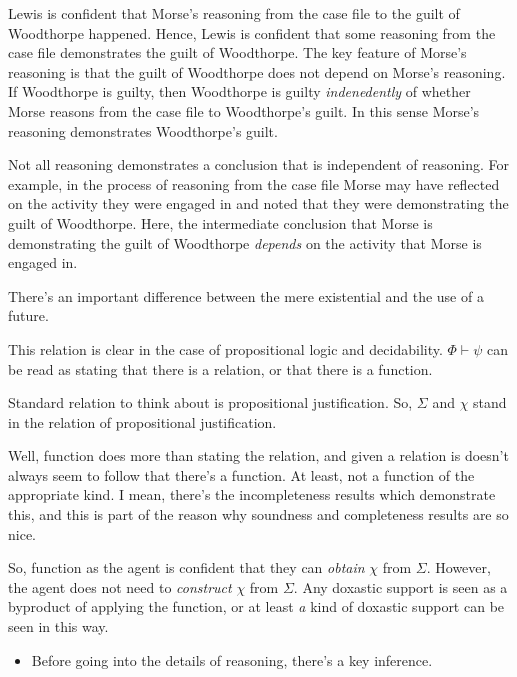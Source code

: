 \documentclass[10pt]{article}
\begin{document}
Lewis is confident that Morse's reasoning from the case file to the guilt of Woodthorpe happened.
Hence, Lewis is confident that some reasoning from the case file demonstrates the guilt of Woodthorpe.
The key feature of Morse's reasoning is that the guilt of Woodthorpe does not depend on Morse's reasoning.
If Woodthorpe is guilty, then Woodthorpe is guilty \emph{indenedently} of whether Morse reasons from the case file to Woodthorpe's guilt.
In this sense Morse's reasoning demonstrates Woodthorpe's guilt.

Not all reasoning demonstrates a conclusion that is independent of reasoning.
For example, in the process of reasoning from the case file Morse may have reflected on the activity they were engaged in and noted that they were demonstrating the guilt of Woodthorpe.
Here, the intermediate conclusion that Morse is demonstrating the guilt of Woodthorpe \emph{depends} on the activity that Morse is engaged in.



\begin{note}[Observation]
There's an important difference between the mere existential and the use of a future.
\end{note}

\begin{note}
  This relation is clear in the case of propositional logic and decidability.
  \(\Phi \vdash \psi\) can be read as stating that there is a relation, or that there is a function.

  Standard relation to think about is propositional justification.
  So, \(\Sigma\) and \(\chi\) stand in the relation of propositional justification.

  Well, function does more than stating the relation, and given a relation is doesn't always seem to follow that there's a function.
  At least, not a function of the appropriate kind.
  I mean, there's the incompleteness results which demonstrate this, and this is part of the reason why soundness and completeness results are so nice.

  So, function as the agent is confident that they can \emph{obtain} \(\chi\) from \(\Sigma\).
  However, the agent does not need to \emph{construct} \(\chi\) from \(\Sigma\).
  Any doxastic support is seen as a byproduct of applying the function, or at least \emph{a} kind of doxastic support can be seen in this way.
\end{note}


\begin{itemize}
\item Before going into the details of reasoning, there's a key inference.
\end{itemize}
\end{document}
